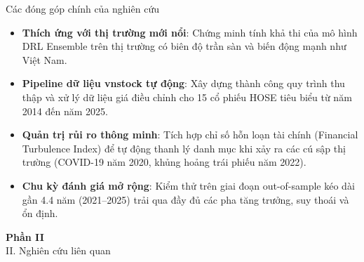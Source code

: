 \documentclass[10pt,aspectratio=169]{beamer}
\begin{document}
\begin{frame}{Các đóng góp chính của nghiên cứu}
  \begin{itemize}
    \item[\color{accent}\checkmark] \textbf{Thích ứng với thị trường mới nổi}: Chứng minh tính khả thi của mô hình DRL Ensemble trên thị trường có biên độ trần sàn và biến động mạnh như Việt Nam.
    \item[\color{accent}\checkmark] \textbf{Pipeline dữ liệu vnstock tự động}: Xây dựng thành công quy trình thu thập và xử lý dữ liệu giá điều chỉnh cho 15 cổ phiếu HOSE tiêu biểu từ năm 2014 đến năm 2025.
    \item[\color{accent}\checkmark] \textbf{Quản trị rủi ro thông minh}: Tích hợp chỉ số hỗn loạn tài chính (Financial Turbulence Index) để tự động thanh lý danh mục khi xảy ra các cú sập thị trường (COVID-19 năm 2020, khủng hoảng trái phiếu năm 2022).
    \item[\color{accent}\checkmark] \textbf{Chu kỳ đánh giá mở rộng}: Kiểm thử trên giai đoạn out-of-sample kéo dài gần 4.4 năm (2021--2025) trải qua đầy đủ các pha tăng trưởng, suy thoái và ổn định.
  \end{itemize}
\end{frame}

\begin{frame}[plain,c]
  \color{white}
  \centering
  \Huge \textbf{Phần II}\\
  \vspace{0.5cm}
  \Large \color{secondary} II. Nghiên cứu liên quan
\end{frame}
\end{document}
